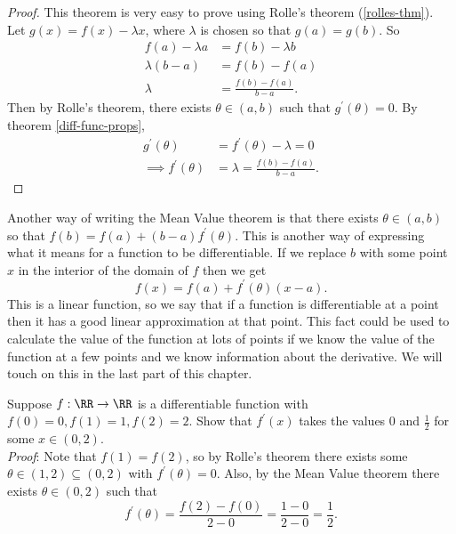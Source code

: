 \documentclass[../real_analysis.tex]{subfiles}
\begin{document}
        \begin{proof}
            This theorem is very easy to prove using Rolle's theorem (\ref{rolles-thm}). Let $g(x)=f(x)-\lambda x$, where $\lambda$ is chosen so that $g(a)=g(b)$. So
            \begin{align}
                f(a)-\lambda a&=f(b)-\lambda b\\
                \lambda(b-a)&=f(b)-f(a)\\
                \lambda&=\frac{f(b)-f(a)}{b-a}.
            \end{align}
            Then by Rolle's theorem, there exists $\theta\in(a,b)$ such that $g^\prime(\theta)=0$. By theorem \ref{diff-func-props},
            \begin{align}
                g^\prime(\theta)&=f^\prime(\theta)-\lambda=0\\
                \implies f^\prime(\theta)&=\lambda=\frac{f(b)-f(a)}{b-a}.
            \end{align}
        \end{proof}
        Another way of writing the Mean Value theorem is that there exists $\theta\in(a,b)$ so that $f(b)=f(a)+(b-a)f^\prime(\theta)$. This is another way of expressing what it means for a function to be differentiable. If we replace $b$ with some point $x$ in the interior of the domain of $f$ then we get
        \begin{equation}
            f(x)=f(a)+f^\prime(\theta)(x-a).
        \end{equation}
        This is a linear function, so we say that if a function is differentiable at a point then it has a good linear approximation at that point. This fact could be used to calculate the value of the function at lots of points if we know the value of the function at a few points and we know information about the derivative. We will touch on this in the last part of this chapter.
        \begin{example}
            Suppose $f:\RR\to\RR$ is a differentiable function with $f(0)=0,f(1)=1,f(2)=2$. Show that $f^\prime(x)$ takes the values 0 and $\frac{1}{2}$ for some $x\in(0,2)$.\\
            \textit{Proof}: Note that $f(1)=f(2)$, so by Rolle's theorem there exists some $\theta\in(1,2)\subseteq(0,2)$ with $f^\prime(\theta)=0$. Also, by the Mean Value theorem there exists $\theta\in(0,2)$ such that
            \begin{equation}
                f^\prime(\theta)=\frac{f(2)-f(0)}{2-0}=\frac{1-0}{2-0}=\frac{1}{2}.
            \end{equation}
        \end{example}
\end{document}
